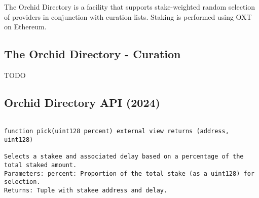 \documentclass{article}
\begin{document}
The Orchid Directory is a facility that supports stake-weighted random selection of providers in conjunction with curation lists.  Staking is performed using OXT on Ethereum.

\subsection{The Orchid Directory - Curation}
TODO

\subsection{Orchid Directory API (2024)}

\begin{verbatim}

function pick(uint128 percent) external view returns (address, uint128)

Selects a stakee and associated delay based on a percentage of the total staked amount.
Parameters: percent: Proportion of the total stake (as a uint128) for selection.
Returns: Tuple with stakee address and delay.
\end{verbatim}






{}

    
\end{document}
